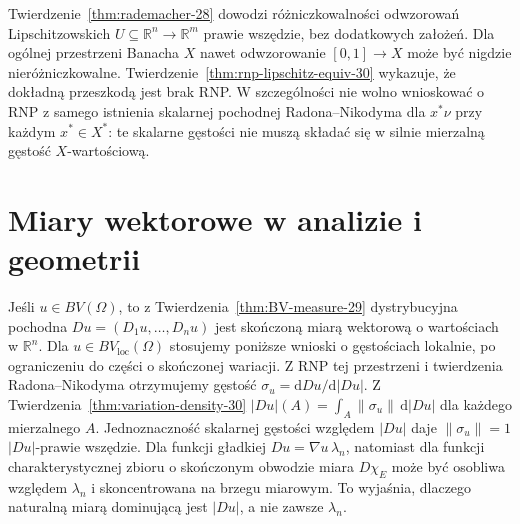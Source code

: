 \begin{uwaga}
Twierdzenie~\ref{thm:rademacher-28} dowodzi
różniczkowalności odwzorowań Lipschitzowskich
$U\subseteq\mathbb R^n\to\mathbb R^m$ prawie
wszędzie, bez dodatkowych założeń. Dla ogólnej
przestrzeni Banacha $X$ nawet odwzorowanie
$[0,1]\to X$ może być nigdzie nieróżniczkowalne.
Twierdzenie~\ref{thm:rnp-lipschitz-equiv-30}
wykazuje, że dokładną przeszkodą jest brak RNP.
W szczególności nie wolno wnioskować o RNP
z samego istnienia skalarnej pochodnej
Radona--Nikodyma dla $x^*\nu$ przy każdym
$x^*\in X^*$: te skalarne gęstości nie muszą
składać się w silnie mierzalną gęstość $X$-wartościową.
\end{uwaga}

\section{Miary wektorowe w analizie i geometrii}
\label{sec:vector-applications-30}
\begin{przyklad}
Jeśli $u\in BV(\Omega)$, to z
Twierdzenia~\ref{thm:BV-measure-29} dystrybucyjna
pochodna $Du=(D_1u,\ldots,D_nu)$ jest skończoną
miarą wektorową o wartościach w $\mathbb R^n$.
Dla $u\in BV_{\mathrm{loc}}(\Omega)$ stosujemy
poniższe wnioski o gęstościach lokalnie, po ograniczeniu
do części o skończonej wariacji.
Z RNP tej przestrzeni i twierdzenia
Radona--Nikodyma otrzymujemy gęstość
$\sigma_u=\mathrm dDu/\mathrm d|Du|$.
Z Twierdzenia~\ref{thm:variation-density-30}
$|Du|(A)=\int_A\|\sigma_u\|\,\mathrm d|Du|$
dla każdego mierzalnego $A$. Jednoznaczność
skalarnej gęstości względem $|Du|$ daje
$\|\sigma_u\|=1$ $|Du|$-prawie wszędzie. Dla funkcji gładkiej
$Du=\nabla u\,\lambda_n$, natomiast dla funkcji
charakterystycznej zbioru o skończonym obwodzie
miara $D\chi_E$ może być osobliwa względem
$\lambda_n$ i skoncentrowana na brzegu miarowym.
To wyjaśnia, dlaczego naturalną miarą dominującą
jest $|Du|$, a nie zawsze $\lambda_n$.
\end{przyklad}

